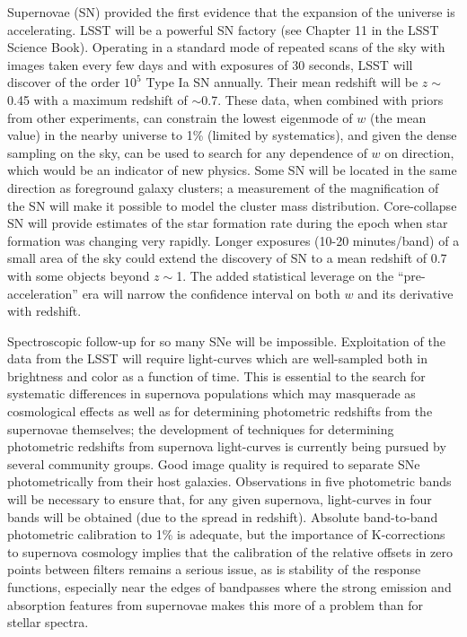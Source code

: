 Supernovae (SN) provided the first evidence that the expansion of the
universe is accelerating. LSST will be a powerful SN factory
(see Chapter 11 in the LSST Science Book). Operating in
a standard mode of repeated scans of the sky with images taken every few
days and with exposures of 30 seconds, LSST will discover
of the order $10^5$ Type Ia
SN annually. Their mean redshift will be $z\sim$0.45 with a maximum
redshift of $\sim$0.7. These data, when combined with priors from other
experiments, can constrain the lowest eigenmode of $w$ (\ie the mean
value) in the nearby universe to 1\% (limited by systematics),
and given the dense sampling on
the sky, can be used to search for any dependence of $w$ on direction,
which would be an indicator of new physics.  Some SN will be located in the
same direction as foreground galaxy clusters; a measurement of the
magnification of the SN will make it possible to model the cluster mass
distribution. Core-collapse SN will provide estimates of the star formation
rate during the epoch when star formation was changing very rapidly.
Longer exposures (10-20 minutes/band) of a small area of the sky could
extend the discovery of SN to a mean redshift of 0.7 with some objects
beyond $z\sim$1.  The added statistical leverage on the
``pre-acceleration'' era will narrow the confidence interval on both $w$
and its derivative with redshift.

Spectroscopic follow-up for so many SNe will be impossible. Exploitation of
the data from the LSST will require light-curves which are well-sampled both
in brightness and color as a function of time. This is essential to the
search for systematic differences in supernova populations which may
masquerade as cosmological effects as well as for determining photometric
redshifts from the supernovae themselves; the development of techniques for
determining photometric redshifts from supernova light-curves is currently
being pursued by several community groups. Good image quality is required
to separate SNe photometrically from their host galaxies. Observations in
five photometric bands will be necessary to ensure that, for any given
supernova, light-curves in four  bands will be obtained (due to the spread in
redshift). Absolute band-to-band photometric calibration to 1\% is adequate, but
the importance of K-corrections to supernova cosmology implies that the
calibration of the relative offsets in zero points between filters remains
a serious issue, as
is stability of the response functions, especially near the edges of
bandpasses where the strong emission and absorption features from supernovae
makes this more of a problem than for stellar spectra.

